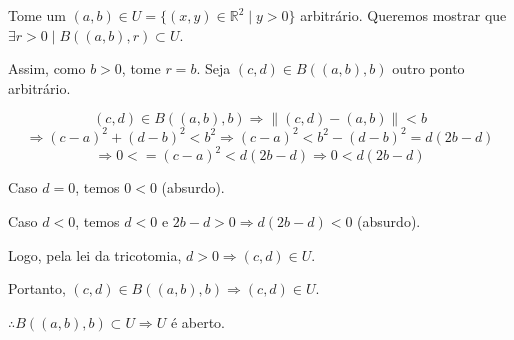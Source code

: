 \documentclass[../main.tex]{subfiles}
\begin{document}
		\begin{solucao}
			Tome um $(a,b)\in U=\{(x, y)\in \mathbb{R}^2\mid y > 0\}$ arbitrário. Queremos mostrar que $\exists r>0\mid B((a,b),r)\subset U$.
			
			Assim, como $b>0$, tome $r=b$. Seja $(c,d)\in B((a,b),b)$ outro ponto arbitrário.
			
			\[
			(c,d)\in B((a,b),b)\Rightarrow \|(c,d)-(a,b)\|<b
			\]
			\[
			\Rightarrow (c-a)^2+(d-b)^2<b^2 \Rightarrow (c-a)^2<b^2-(d-b)^2=d(2b-d)
			\]
			\[
			\Rightarrow 0<=(c-a)^2<d(2b-d)\Rightarrow 0<d(2b-d)
			\]
			
			Caso $d=0$, temos $0<0$ (absurdo).
			
			Caso $d<0$, temos $d<0$ e $2b-d>0 \Rightarrow d(2b-d)<0$ (absurdo).
			
			Logo, pela lei da tricotomia, $d>0\Rightarrow (c,d)\in U$.
			
			Portanto, $(c,d)\in B((a,b),b)\Rightarrow (c,d)\in U$.
			
			$\therefore B((a,b),b)\subset U \Rightarrow U$ é aberto. 
		\end{solucao}
	
\end{document}
